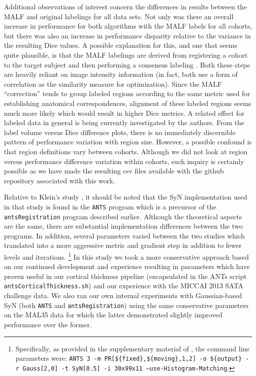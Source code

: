 \documentclass{frontiersSCNS}
\begin{document}
Additional observations of interest concern the differences in results
between the MALF and original labelings for all data sets.  Not only was
there an overall increase in performance for both algorithms with the 
MALF labels for all cohorts, but there was
also an increase in performance disparity relative to the variance in the
resulting Dice values.  A possible explanation for this, and one that seems
quite plausible, is that the MALF labelings are derived from registering
a cohort to the target subject and then performing a consensus labeling \cite{wang2012}.  
Both these steps are heavily reliant on image intensity information (in
fact, both use a form of correlation as the similarity measure for
optimization).  Since the MALF ``correction'' tends to group labeled regions 
according to the same metric used for establishing anatomical correspondences,
alignment of these labeled regions seems much more likely which would result 
in higher Dice metrics.  A related effect for labeled data in general is 
being currently investigated by the authors.
From the label volume versus Dice difference plots, there is no immediately 
discernible pattern of performance variation with region size.  However,
a possible confound is that region definitions vary between cohorts.  Although
we did not look at region versus performance difference variation within cohorts,
such inquiry is certainly possible as we have made the resulting csv files
available with the github repository associated with this work.


Relative to Klein's study \citep{klein2009}, it should be noted that 
the SyN implementation used in that study is found in the {\tt ANTS} 
program which is a precursor of the {\tt antsRegistration} program
described earlier.  Although the theoretical aspects 
are the same, there are substantial implementation differences between 
the two programs.  In addition, several parameters varied between the two
studies which translated into a more aggressive metric and 
gradient step in addition to fewer levels and iterations.%
\footnote{
Specifically, as provided in the supplementary material of \cite{klein2009},
the command line parameters were:
{\tt ANTS 3 -m PR[\$\{fixed\},\$\{moving\},1,2] -o \$\{output\} -r Gauss[2,0] 
-t SyN[0.5] -i 30x99x11 --use-Histogram-Matching}.  
}
In this study we took a more conservative approach based on our 
continued development and experience resulting in parameters which have proven
useful in our cortical thickness pipeline (encapsulated in 
the ANTs script {\tt antsCorticalThickness.sh}) and our
experience with the MICCAI 2013 SATA challenge data.  We also 
ran our own internal experiments with Gaussian-based SyN (both {\tt ANTS} and 
{\tt antsRegistration}) using the same conservative parameters 
on the MAL35 data for which the latter demonstrated slightly improved
performance over the former.  
\end{document}
